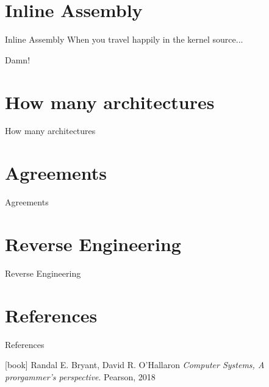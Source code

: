 \documentclass[UKenglish]{beamer}
\begin{document}
\section{Inline Assembly}
\begin{frame}{Inline Assembly}
  When you travel happily in the kernel source...
  \begin{alertblock}{Damn!}
 \end{alertblock}
  
\end{frame}

\section{How many architectures}
\begin{frame}{How many architectures}
  
\end{frame}

\section{Agreements}
\begin{frame}{Agreements}
  
\end{frame}

\section{Reverse Engineering}
\begin{frame}{Reverse Engineering}
  
\end{frame}

\section{References}
\begin{frame}[allowframebreaks]{References}
    \begin{thebibliography}{}

        [book]
         Randal E. Bryant, David R. O'Hallaron
        \newblock \emph{Computer Systems, A prorgammer's perspective}.
        \newblock Pearson, 2018
        \end{thebibliography}
\end{frame}
\end{document}
